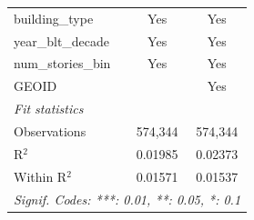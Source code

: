 \begin{tabular}{lcc}
   building\_type          & Yes            & Yes\\  
   year\_blt\_decade       & Yes            & Yes\\  
   num\_stories\_bin       & Yes            & Yes\\  
   GEOID                   &                & Yes\\  
   \midrule
   \emph{Fit statistics}\\
   Observations            & 574,344        & 574,344\\  
   R$^2$                   & 0.01985        & 0.02373\\  
   Within R$^2$            & 0.01571        & 0.01537\\  
   \midrule \midrule
   \multicolumn{3}{l}{\emph{Signif. Codes: ***: 0.01, **: 0.05, *: 0.1}}\\
\end{tabular}
\par\endgroup
\begingroup
\centering

